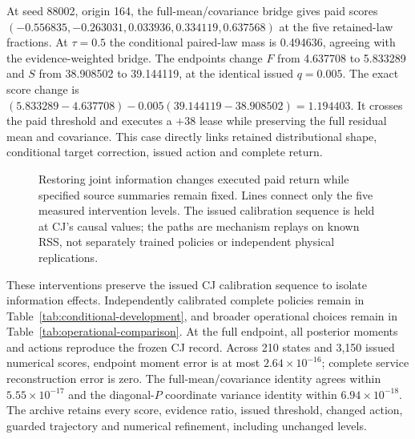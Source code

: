 \documentclass[10pt]{article}
\begin{document}
At seed 88002, origin 164, the full-mean/covariance bridge gives paid
scores $(-0.556835,-0.263031,0.033936,0.334119,0.637568)$ at the five
retained-law fractions. At $\tau=0.5$ the conditional paired-law mass is
0.494636, agreeing with the evidence-weighted bridge. The endpoints change
$F$ from 4.637708 to 5.833289 and $S$ from 38.908502 to 39.144119,
at the identical issued $q=0.005$. The exact score change is
$(5.833289-4.637708)-0.005(39.144119-38.908502)=1.194403$.
It crosses the paid threshold and executes a $+38$ lease while preserving
the full residual mean and covariance. This case directly links retained
distributional shape, conditional target correction, issued action and
complete return.

\begin{figure}[t]
\centering
{}
\caption{Restoring joint information changes executed paid return while
specified source summaries remain fixed. Lines connect only the five
measured intervention levels. The issued calibration sequence is held at
CJ's causal values; the paths are mechanism replays on known RSS,
not separately trained policies or independent physical replications.}
\label{fig:rss-pairing-bridge}
\end{figure}

These interventions preserve the issued CJ calibration sequence to isolate
information effects. Independently calibrated complete policies remain in
Table~\ref{tab:conditional-development}, and broader operational choices
remain in Table~\ref{tab:operational-comparison}. At the full endpoint,
all posterior moments and actions reproduce the frozen CJ record.
Across 210 states and 3,150 issued numerical scores, endpoint moment error
is at most $2.64\times10^{-16}$; complete service reconstruction error is
zero. The full-mean/covariance identity agrees within
$5.55\times10^{-17}$ and the diagonal-$P$ coordinate variance identity
within $6.94\times10^{-18}$. The archive retains every score, evidence
ratio, issued threshold, changed action, guarded trajectory and numerical
refinement, including unchanged levels.
\end{document}
